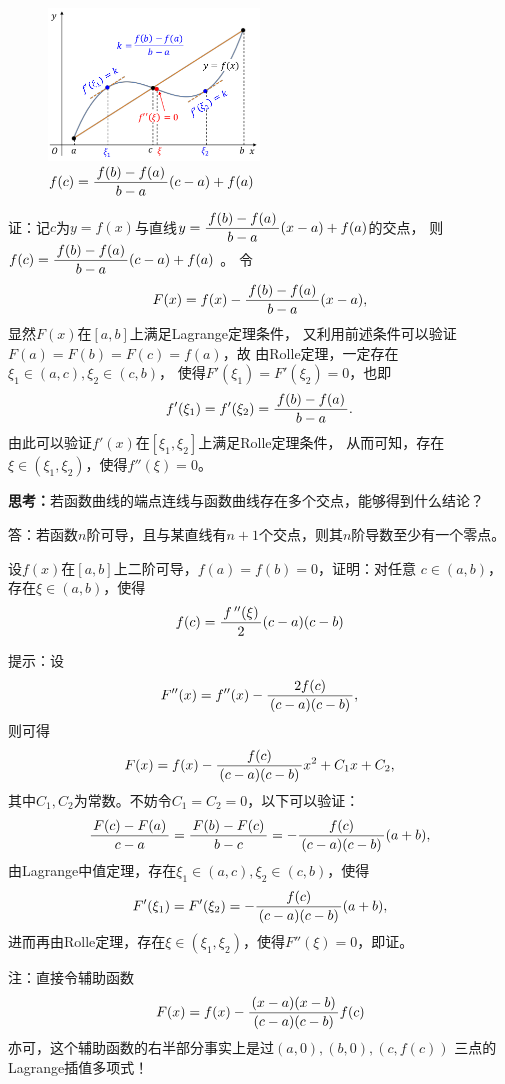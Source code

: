 \begin{figure}[h]
	\centering
	\includegraphics[width=0.5\textwidth]
	{./Images/Ch03/lag2pf2.pdf}
	\caption{$f(c)=\displaystyle\frac{\,{f(b)-f(a)}\,}{\,{b-a}\,}(c-a)+f(a)$}
	\label{fig:lag2pf2}
\end{figure}

证：记$c$为$y=f(x)$与直线$y=\displaystyle\frac{\,{f(b)-f(a)}\,}{\,{b-a}\,}(x-a)+f(a)$的交点，
则$f(c)=\displaystyle\frac{\,{f(b)-f(a)}\,}{\,{b-a}\,}(c-a)+f(a)$
。
令
$$F(x)=f(x)-\displaystyle\frac{\,{f(b)-f(a)}\,}{\,{b-a}\,}(x-a),$$
显然$F(x)$在$[a,b]$上满足Lagrange定理条件，
又利用前述条件可以验证$F(a)=F(b)=F(c)=f(a)$，故
由Rolle定理，一定存在$\xi_1\in(a,c),\xi_2\in(c,b)$，
使得$F'(\xi_1)=F'(\xi_2)=0$，也即
$$f'(\xi_1)=f'(\xi_2)=\displaystyle\frac{\,{f(b)-f(a)}\,}{\,{b-a}\,}.$$
由此可以验证$f'(x)$在$[\xi_1,\xi_2]$上满足Rolle定理条件，
从而可知，存在$\xi\in(\xi_1,\xi_2)$，使得$f''(\xi)=0$。
\fin

\bs
{\bf 思考：}若函数曲线的端点连线与函数曲线存在多个交点，能够得到什么结论？

\ifhint
答：若函数$n$阶可导，且与某直线有$n+1$个交点，则其$n$阶导数至少有一个零点。
\fi

\bs
\egz 设$f(x)$在$[a,b]$上二阶可导，$f(a)=f(b)=0$，证明：对任意
$c\in(a,b)$，存在$\xi\in(a,b)$，使得
$$f(c)=\displaystyle\frac{\,{f\,''(\xi)}\,}{\,{2}\,}(c-a)(c-b)$$

提示：设
$$F''(x)=f''(x)-\displaystyle\frac{\,{2f(c)}\,}{\,{(c-a)(c-b)}\,},$$
则可得
$$F(x)=f(x)-\displaystyle\frac{\,{f(c)}\,}{\,{(c-a)(c-b)}\,}x^2+C_1x+C_2,$$
其中$C_1,C_2$为常数。不妨令$C_1=C_2=0$，以下可以验证：
$$\displaystyle\frac{\,{F(c)-F(a)}\,}{\,{c-a}\,}=\displaystyle\frac{\,{F(b)-F(c)}\,}{\,{b-c}\,}
=-\displaystyle\frac{\,{f(c)}\,}{\,{(c-a)(c-b)}\,}(a+b),$$
由Lagrange中值定理，存在$\xi_1\in(a,c),\xi_2\in(c,b)$，使得
$$F'(\xi_1)=F'(\xi_2)=-\displaystyle\frac{\,{f(c)}\,}{\,{(c-a)(c-b)}\,}(a+b),$$
进而再由Rolle定理，存在$\xi\in(\xi_1,\xi_2)$，使得$F''(\xi)=0$，即证。

注：直接令辅助函数
$$F(x)=f(x)-\displaystyle\frac{\,{(x-a)(x-b)}\,}{\,{(c-a)(c-b)}\,}f(c)$$
亦可，这个辅助函数的右半部分事实上是过$(a,0),(b,0),(c,f(c))$
三点的{\kaishu Lagrange插值多项式}！

